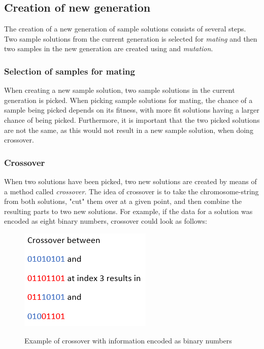 \subsection{Creation of new generation}
The creation of a new generation of sample solutions consists of several steps. Two sample solutions from the current generation is selected for \textit{mating} and then two samples in the new generation are created using  and \textit{mutation}.

\subsubsection{Selection of samples for mating}
When creating a new sample solution, two sample solutions in the current generation is picked. When picking sample solutions for mating, the chance of a sample being picked depends on its fitness, with more fit solutions having a larger chance of being picked. Furthermore, it is important that the two picked solutions are not the same, as this would not result in a new sample solution, when doing crossover.

\subsubsection{Crossover}
When two solutions have been picked, two new solutions are created by means of a method called \textit{crossover}. The idea of crossover is to take the chromosome-string from both solutions, "cut" them over at a given point, and then combine the resulting parts to two new solutions. For example, if the data for a solution was encoded as eight binary numbers, crossover could look as follows:

\begin{figure}[h]
	\centering
	{\includegraphics[scale=0.5]{Images/crossover_binary.PNG}}\\[0.5cm]
	\caption{Example of crossover with information encoded as binary numbers}
	\label{fig:crossover_binary}
\end{figure}



